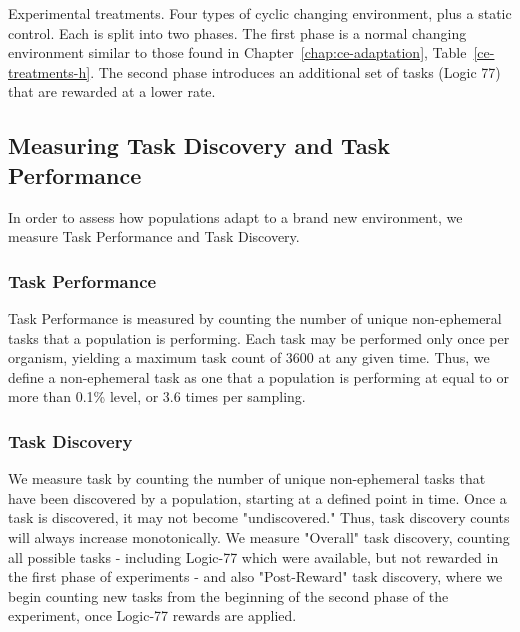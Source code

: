 \documentclass[PhD]{msu-thesis}
\begin{document}
\begin{table}[]
\begin{tabular}{|c|c||c|c||c|c|c|}
	\end{tabular} 

	\begin{flushleft} Experimental treatments. Four types of cyclic changing environment, plus a static control. Each is split into two phases. The first phase is a normal changing environment similar to those found in Chapter~\ref{chap:ce-adaptation}, Table~\ref{ce-treatments-h}. The second phase introduces an additional set of tasks (Logic 77) that are rewarded at a lower rate.
	\end{flushleft}
	\label{cel-treatments}
	\end{table}


\subsection{Measuring Task Discovery and Task Performance}
In order to assess how populations adapt to a brand new environment, we measure Task Performance and Task Discovery.

\subsubsection{Task Performance}
Task Performance is measured by counting the number of unique non-ephemeral tasks that a population is performing. Each task may be performed only once per organism, yielding a maximum task count of 3600 at any given time. Thus, we define a non-ephemeral task as one that a population is performing at equal to or more than 0.1\% level, or 3.6 times per sampling. 

\subsubsection{Task Discovery}
We measure task by counting the number of unique non-ephemeral tasks that have been discovered by a population, starting at a defined point in time. Once a task is discovered, it may not become "undiscovered." Thus, task discovery counts will always increase monotonically. We measure "Overall" task discovery, counting all possible tasks - including Logic-77 which were available, but not rewarded in the first phase of experiments - and also "Post-Reward" task discovery, where we begin counting new tasks from the beginning of the second phase of the experiment, once Logic-77 rewards are applied. 
\end{document}

